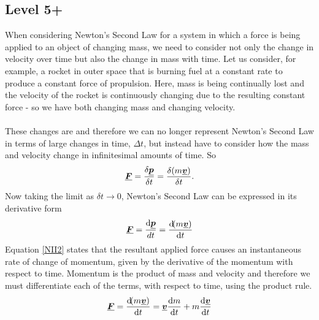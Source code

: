 \subsection{Level 5+}
When considering Newton's Second Law for a system in which a force is being applied to an object of changing mass, we need to consider not only the change in velocity over time but also the change in mass with time.  Let us consider, for example, a rocket in outer space that is burning fuel at a constant rate to produce a constant force of propulsion.  Here, mass is being continually lost and the velocity of the rocket is continuously changing due to the resulting constant force - so we have both changing mass and changing velocity.\\
\\
These changes are  and therefore we can no longer represent Newton's Second Law in terms of large changes in time, $\Delta t$, but instead have to consider how the mass and velocity change in infinitesimal amounts of time.  So
\begin{equation}
{\mathit{\underline{\boldsymbol{F}}}}= \frac{\delta{\mathit{\underline{\boldsymbol{p}}}}}{\delta t}= \frac{\delta(m {\mathit{\underline{\boldsymbol{v}}}})}{\delta t}.
\end{equation}
Now taking the limit as $\delta t \rightarrow 0$, Newton's Second Law can be expressed in its derivative form
\begin{equation}
{\mathit{\underline{\boldsymbol{F}}}}=\frac{\operatorname{d}\!{\mathit{\underline{\boldsymbol{p}}}}}{dt}=\frac{\operatorname{d}\!(m{\mathit{\underline{\boldsymbol{v}}}})}{\operatorname{d}\! t} \label{NII2}
\end{equation}
Equation \ref{NII2} states that the resultant applied force causes an instantaneous rate of change of momentum, given by the derivative of the momentum with respect to time.  Momentum is the product of mass and velocity and therefore we must differentiate each of the terms, with respect to time, using the product rule.
 \begin{equation}
{\mathit{\underline{\boldsymbol{F}}}}=\frac{\operatorname{d}\!(m{\mathit{\underline{\boldsymbol{v}}}})}{\operatorname{d}\! t}={\mathit{\underline{\boldsymbol{v}}}}\frac{\operatorname{d}\! m}{\operatorname{d}\! t}+m\frac{\operatorname{d}\!{\mathit{\underline{\boldsymbol{v}}}}}{\operatorname{d}\! t}
\end{equation}
